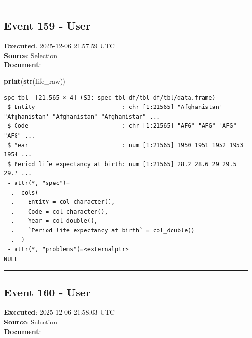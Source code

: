 \documentclass[
  11pt,
]{article}
\newenvironment{Shaded}{\begin{snugshade}}{\end{snugshade}}
\newcommand{\FunctionTok}[1]{\textcolor[rgb]{0.13,0.29,0.53}{\textbf{#1}}}
\newcommand{\NormalTok}[1]{#1}
\newenvironment{rpoutput}{\vspace{0.5em}\begin{snugshade}}{\end{snugshade}}
\begin{document}
\begin{center}\rule{0.5\linewidth}{0.5pt}\end{center}

\subsection{Event 159 - User}\label{event-159---user}

\textbf{Executed}: 2025-12-06 21:57:59 UTC\\
\textbf{Source}: Selection\\
\textbf{Document}:

\begin{Shaded}
\begin{Highlighting}[]
\FunctionTok{print}\NormalTok{(}\FunctionTok{str}\NormalTok{(life\_raw))}
\end{Highlighting}
\end{Shaded}

\begin{rpoutput}

\begin{verbatim}
spc_tbl_ [21,565 × 4] (S3: spec_tbl_df/tbl_df/tbl/data.frame)
 $ Entity                         : chr [1:21565] "Afghanistan" "Afghanistan" "Afghanistan" "Afghanistan" ...
 $ Code                           : chr [1:21565] "AFG" "AFG" "AFG" "AFG" ...
 $ Year                           : num [1:21565] 1950 1951 1952 1953 1954 ...
 $ Period life expectancy at birth: num [1:21565] 28.2 28.6 29 29.5 29.7 ...
 - attr(*, "spec")=
  .. cols(
  ..   Entity = col_character(),
  ..   Code = col_character(),
  ..   Year = col_double(),
  ..   `Period life expectancy at birth` = col_double()
  .. )
 - attr(*, "problems")=<externalptr> 
NULL
\end{verbatim}

\end{rpoutput}

\begin{center}\rule{0.5\linewidth}{0.5pt}\end{center}

\subsection{Event 160 - User}\label{event-160---user}

\textbf{Executed}: 2025-12-06 21:58:03 UTC\\
\textbf{Source}: Selection\\
\textbf{Document}:
\end{document}
